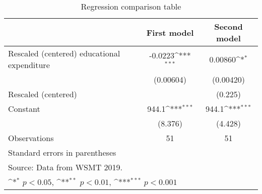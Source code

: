 \begin{table}[htbp]\centering
\def\sym#1{\ifmmode^{#1}\else\(^{#1}\)\fi}
\caption{Regression comparison table}
\begin{tabular}{l*{2}{c}}
\hline\hline
                    &\multicolumn{1}{c}{First model}&\multicolumn{1}{c}{Second model}\\
\hline
Rescaled (centered) educational expenditure&     -0.0223\sym{***}&     0.00860\sym{*}  \\
                    &   (0.00604)         &   (0.00420)         \\
[1em]
Rescaled (centered) %
                    &                     &     (0.225)         \\
[1em]
Constant            &       944.1\sym{***}&       944.1\sym{***}\\
                    &     (8.376)         &     (4.428)         \\
\hline
Observations        &          51         &          51         \\
\hline\hline
\multicolumn{3}{l}{\footnotesize Standard errors in parentheses}\\
\multicolumn{3}{l}{\footnotesize Source: Data from WSMT 2019.}\\
\multicolumn{3}{l}{\footnotesize \sym{*} \(p<0.05\), \sym{**} \(p<0.01\), \sym{***} \(p<0.001\)}\\
\end{tabular}
\end{table}
